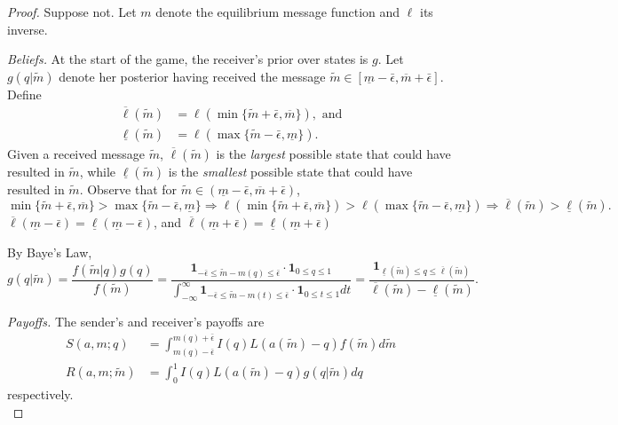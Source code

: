 \documentclass[12pt]{article}
\begin{document}
\begin{proof}
Suppose not. Let $m$ denote the equilibrium message function and $\ell$ its inverse. 

\noindent\textit{Beliefs.} At the start of the game, the receiver's prior over states is $g$. Let $g(q|\tilde{m})$ denote her posterior having received the message $\tilde{m}\in[\underline{m}-\bar{\epsilon},\overline{m}+\bar{\epsilon}]$. Define 
\begin{align}
\overline{\ell}(\tilde{m})&=\ell(\min\{\tilde{m}+\bar{\epsilon},\overline{m}\}),\text{ and}\\
\underline{\ell}(\tilde{m})&=\ell(\max\{\tilde{m}-\bar{\epsilon},\underline{m}\}).
\end{align} 
Given a received message $\tilde{m}$, $\overline{\ell}(\tilde{m})$ is the \textit{largest} possible state that could have resulted in $\tilde{m}$, while $\underline{\ell}(\tilde{m})$ is the \textit{smallest} possible state that could have resulted in $\tilde{m}$. Observe that for $\tilde{m}\in(\underline{m}-\bar{\epsilon},\overline{m}+\bar{\epsilon})$, 
\begin{equation}
\min\{\tilde{m}+\bar{\epsilon},\overline{m}\}>\max\{\tilde{m}-\bar{\epsilon},\underline{m}\}\Rightarrow\ell(\min\{\tilde{m}+\bar{\epsilon},\overline{m}\})>\ell(\max\{\tilde{m}-\bar{\epsilon},\underline{m}\})\Rightarrow\overline{\ell}(\tilde{m})>\underline{\ell}(\tilde{m}).
\end{equation}
$\overline{\ell}(\underline{m}-\bar{\epsilon})=\underline{\ell}(\underline{m}-\bar{\epsilon})$, and $\overline{\ell}(\underline{m}+\bar{\epsilon})=\underline{\ell}(\underline{m}+\bar{\epsilon})$

By Baye's Law,
\begin{equation}
g(q|\tilde{m})=\frac{f(\tilde{m}|q)g(q)}{f(\tilde{m})}=\frac{\mathbf{1}_{-\bar{\epsilon}\leq\tilde{m}-m(q)\leq\bar{\epsilon}}\cdot\mathbf{1}_{0\leq q\leq 1}}{\int_{-\infty}^{\infty}{\mathbf{1}_{-\bar{\epsilon}\leq\tilde{m}-m(t)\leq\bar{\epsilon}}\cdot\mathbf{1}_{0\leq t\leq 1}}dt}=\frac{\mathbf{1}_{\underline{\ell}(\tilde{m})\leq q\leq\overline{\ell}(\tilde{m})}}{\overline{\ell}(\tilde{m})-\underline{\ell}(\tilde{m})}.
\end{equation}

\noindent\textit{Payoffs.} The sender's and receiver's payoffs are 
\begin{align}
S(a,m;q)&=\int_{m(q)-\bar{\epsilon}}^{m(q)+\bar{\epsilon}}{I(q)L(a(\tilde{m})-q)f(\tilde{m})d\tilde{m}}\\
R(a,m;\tilde{m})&=\int_{0}^{1}{I(q)L(a(\tilde{m})-q)g(q|\tilde{m})dq}
\end{align}
respectively.\\


\end{proof}
\end{document}
